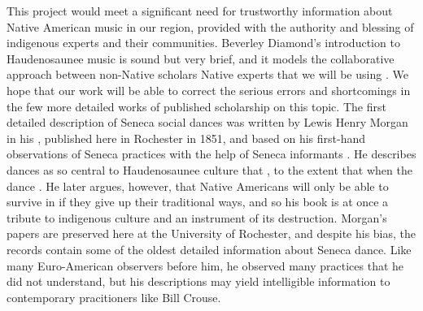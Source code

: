\documentclass{neh}
\begin{document}
This project would meet a significant need for trustworthy information about
Native American music in our region, provided with the authority and blessing
of indigenous experts and their communities.
Beverley Diamond's introduction to Haudenosaunee music is sound but very
brief, and it models the collaborative approach between non-Native scholars
Native experts that we will be using
\Autocite{Diamond:NativeAmericanNortheast}.
We hope that our work will be able to correct the serious errors and
shortcomings in the few more detailed works of published scholarship on this
topic.
The first detailed description of Seneca social dances was written by Lewis
Henry Morgan in his ,
published here in Rochester in 1851, and based on his first-hand observations
of Seneca practices with the help of Seneca informants
\Autocite{Morgan:League}.
He describes dances as so central to Haudenosaunee culture that , to the
extent that when the dance 
\Autocite[261, 263]{Morgan:League}.
He later argues, however, that Native Americans will only be able to survive
in  if they give up their traditional ways, and so his
book is at once a tribute to indigenous culture and an instrument of its
destruction.
Morgan's papers are preserved here at the University of Rochester, and despite
his bias, the records contain some of the oldest detailed information about
Seneca dance.
Like many Euro-American observers before him, he observed many practices that
he did not understand, but his descriptions may yield intelligible information
to contemporary pracitioners like Bill Crouse.
\end{document}
